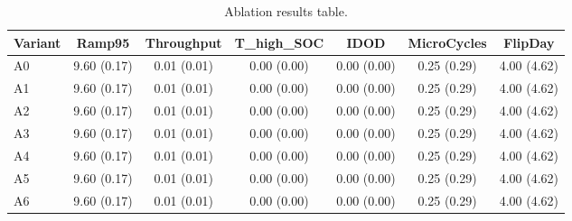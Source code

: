 \begin{table}[t]
\centering
\caption{Ablation results table.}
\label{tab:ablation_auto}
\begin{tabular}{lcccccc}
\toprule
Variant & Ramp95 & Throughput & T\_high\_SOC & IDOD & MicroCycles & FlipDay \\
\midrule
A0 & 9.60 (0.17) & 0.01 (0.01) & 0.00 (0.00) & 0.00 (0.00) & 0.25 (0.29) & 4.00 (4.62) \\
A1 & 9.60 (0.17) & 0.01 (0.01) & 0.00 (0.00) & 0.00 (0.00) & 0.25 (0.29) & 4.00 (4.62) \\
A2 & 9.60 (0.17) & 0.01 (0.01) & 0.00 (0.00) & 0.00 (0.00) & 0.25 (0.29) & 4.00 (4.62) \\
A3 & 9.60 (0.17) & 0.01 (0.01) & 0.00 (0.00) & 0.00 (0.00) & 0.25 (0.29) & 4.00 (4.62) \\
A4 & 9.60 (0.17) & 0.01 (0.01) & 0.00 (0.00) & 0.00 (0.00) & 0.25 (0.29) & 4.00 (4.62) \\
A5 & 9.60 (0.17) & 0.01 (0.01) & 0.00 (0.00) & 0.00 (0.00) & 0.25 (0.29) & 4.00 (4.62) \\
A6 & 9.60 (0.17) & 0.01 (0.01) & 0.00 (0.00) & 0.00 (0.00) & 0.25 (0.29) & 4.00 (4.62) \\
\bottomrule
\end{tabular}
\end{table}